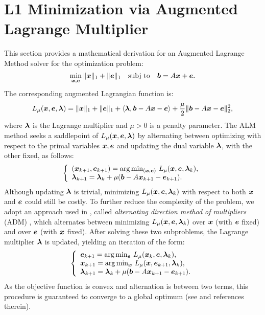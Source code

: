\section{L1 Minimization via Augmented Lagrange Multiplier} 
\label{sec:alm_derivation}

This section provides a mathematical derivation for an Augmented Lagrange Method solver
for the optimization problem:
\begin{equation}
\min_{{\boldsymbol{x}}, \boldsymbol{e}} \| {\boldsymbol{x}} \|_1 + \|\boldsymbol{e}\|_1 \quad \textup{subj to} \quad \boldsymbol{b} =
A {\boldsymbol{x}} + \boldsymbol{e}.
\label{eqn:l1min_denoise}
\end{equation}
The corresponding augmented Lagrangian function is:
\begin{equation}
L_\mu ({\boldsymbol{x}},\boldsymbol{e},\boldsymbol{\lambda}) = \|{\boldsymbol{x}}\|_1 + \|\boldsymbol{e}\|_1 + \langle \boldsymbol{\lambda}, \boldsymbol{b}-A{\boldsymbol{x}} - \boldsymbol{e} \rangle + \frac{\mu}{2} \|\boldsymbol{b} - A{\boldsymbol{x}} - \boldsymbol{e}\|_2^2,
\end{equation}
where $\boldsymbol{\lambda}$ is the Lagrange multiplier and $\mu > 0$ is a
penalty parameter. The ALM method seeks a saddlepoint of $L_\mu
({\boldsymbol{x}},\boldsymbol{e},\boldsymbol{\lambda})$ by alternating between optimizing with respect
to the primal variables ${\boldsymbol{x}}, \boldsymbol{e}$ and updating the dual variable
$\boldsymbol{\lambda}$, with the other fixed, as follows:
\begin{equation}
\left \{
\begin{array}{lll}
({\boldsymbol{x}}_{k+1},\boldsymbol{e}_{k+1})  =  \arg\min_{({\boldsymbol{x}},\boldsymbol{e})} \, L_{\mu} ({\boldsymbol{x}},\boldsymbol{e},\boldsymbol{\lambda}_k),\\
\boldsymbol{\lambda}_{k+1}  =  \boldsymbol{\lambda}_k + \mu (\boldsymbol{b} - A{\boldsymbol{x}}_{k+1} - \boldsymbol{e}_{k+1}). \\
\end{array}
\right .
\label{eqn:alm}
\end{equation}
Although updating $\boldsymbol{\lambda}$ is trivial,
minimizing $L_{\mu} ({\boldsymbol{x}},\boldsymbol{e},\boldsymbol{\lambda}_k)$ with respect to both
${\boldsymbol{x}}$ and $\boldsymbol{e}$ could still be costly. To further reduce the
complexity of the problem, we adopt an approach used in
\cite{YangJ2009-pp}, called \emph{alternating direction
method of multipliers} (ADM) \cite{Glowinski1975-TR}, which alternates between minimizing $L_{\mu} ({\boldsymbol{x}},\boldsymbol{e},\boldsymbol{\lambda}_k)$
over ${\boldsymbol{x}}$ (with $\boldsymbol{e}$ fixed) and over $\boldsymbol{e}$ (with ${\boldsymbol{x}}$ fixed). After solving these two subproblems, the Lagrange multiplier $\boldsymbol{\lambda}$ is updated, yielding an iteration of the form:
\begin{equation}
\left \{
\begin{array}{lll}
\boldsymbol{e}_{k+1}  =  \arg\min_{\boldsymbol{e}} \, L_{\mu} ({\boldsymbol{x}}_k,\boldsymbol{e},\boldsymbol{\lambda}_k),\\
{\boldsymbol{x}}_{k+1}  =  \arg\min_{{\boldsymbol{x}}} \, L_{\mu} ({\boldsymbol{x}},\boldsymbol{e}_{k+1},\boldsymbol{\lambda}_k),\\
\boldsymbol{\lambda}_{k+1}  =  \boldsymbol{\lambda}_k + \mu (\boldsymbol{b} - A{\boldsymbol{x}}_{k+1} - \boldsymbol{e}_{k+1}). \\
\end{array}
\right .
\label{eqn:adm}
\end{equation}
As the objective function is convex and alternation is between two
terms, this procedure is guaranteed to converge to a global optimum (see \cite{YangJ2009-pp} and references therein).

